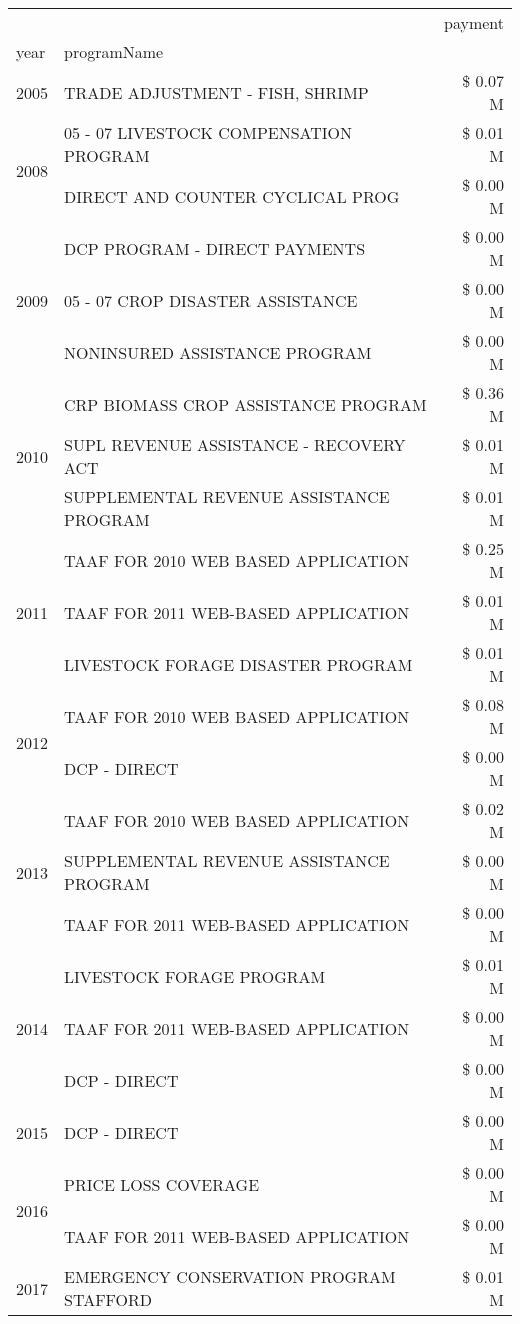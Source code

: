 \begin{tabular}{llr}
\toprule
 &  & payment \\
year & programName &  \\
\midrule
2005 & TRADE ADJUSTMENT - FISH, SHRIMP & \$ 0.07 M \\
\cline{1-3}
\multirow[t]{2}{*}{2008} & 05 - 07 LIVESTOCK COMPENSATION PROGRAM & \$ 0.01 M \\
 & DIRECT AND COUNTER CYCLICAL PROG & \$ 0.00 M \\
\cline{1-3}
\multirow[t]{3}{*}{2009} & DCP PROGRAM - DIRECT PAYMENTS & \$ 0.00 M \\
 & 05 - 07 CROP DISASTER ASSISTANCE & \$ 0.00 M \\
 & NONINSURED ASSISTANCE PROGRAM & \$ 0.00 M \\
\cline{1-3}
\multirow[t]{3}{*}{2010} & CRP BIOMASS CROP ASSISTANCE PROGRAM & \$ 0.36 M \\
 & SUPL REVENUE ASSISTANCE - RECOVERY ACT & \$ 0.01 M \\
 & SUPPLEMENTAL REVENUE ASSISTANCE PROGRAM & \$ 0.01 M \\
\cline{1-3}
\multirow[t]{3}{*}{2011} & TAAF FOR 2010 WEB BASED APPLICATION & \$ 0.25 M \\
 & TAAF FOR 2011 WEB-BASED APPLICATION & \$ 0.01 M \\
 & LIVESTOCK FORAGE DISASTER PROGRAM & \$ 0.01 M \\
\cline{1-3}
\multirow[t]{2}{*}{2012} & TAAF FOR 2010 WEB BASED APPLICATION & \$ 0.08 M \\
 & DCP - DIRECT & \$ 0.00 M \\
\cline{1-3}
\multirow[t]{3}{*}{2013} & TAAF FOR 2010 WEB BASED APPLICATION & \$ 0.02 M \\
 & SUPPLEMENTAL REVENUE ASSISTANCE PROGRAM & \$ 0.00 M \\
 & TAAF FOR 2011 WEB-BASED APPLICATION & \$ 0.00 M \\
\cline{1-3}
\multirow[t]{3}{*}{2014} & LIVESTOCK FORAGE PROGRAM & \$ 0.01 M \\
 & TAAF FOR 2011 WEB-BASED APPLICATION & \$ 0.00 M \\
 & DCP - DIRECT & \$ 0.00 M \\
\cline{1-3}
2015 & DCP - DIRECT & \$ 0.00 M \\
\cline{1-3}
\multirow[t]{2}{*}{2016} & PRICE LOSS COVERAGE & \$ 0.00 M \\
 & TAAF FOR 2011 WEB-BASED APPLICATION & \$ 0.00 M \\
\cline{1-3}
\multirow[t]{2}{*}{2017} & EMERGENCY CONSERVATION PROGRAM STAFFORD & \$ 0.01 M \\

\end{tabular}
